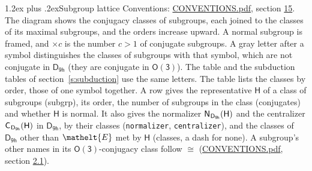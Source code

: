 \documentclass[10pt,a4paper]{article}
\makeatletter
\renewcommand\section{\@startsection{section}{1}{\z@}{-3ex plus -1ex minus -.2ex}%
  {1.2ex plus .2ex}{\normalfont\large\sffamily\bfseries\color{parttitle}}}
\numberwithin{equation}{section}
\newcommand{\eltfont}[1]{{\let\sigma\eltsigma\mathelt{#1}}}
\newcommand{\grp}[1]{\mathsf{#1}}
\newcommand{\cls}[1]{\eltfont{#1}}
\newcommand{\samecls}{\cong}
\newcommand{\hairsp}{\mkern1mu}
\makeatother
\begin{document}
\section{Subgroup lattice}\label{s:subgroups}
Conventions: \href{../../CONVENTIONS.pdf}{CONVENTIONS.pdf}, section \href{../../CONVENTIONS.pdf\#conv.15}{15}.
The diagram shows the conjugacy classes of subgroups, each joined to the classes of its maximal subgroups, and the orders increase upward. A normal subgroup is framed, and ${\times}c$ is the number $c > 1$ of conjugate subgroups. A gray letter after a symbol distinguishes the classes of subgroups with that symbol, which are not conjugate in $\grp{D_{9h}}$ (they are conjugate in \href{O3.pdf}{$\grp{O(3)}$}). The table and the subduction tables of section~\ref{s:subduction} use the same letters. The table lists the classes by order, those of one symbol together. \label{n:group.H}\label{n:head.subgroup}\label{n:head.order}\label{n:head.conjugates}\label{n:head.normal}A row gives the representative $\grp{H}$ of a class of subgroups (subgrp), its order, the number of subgroups in the class (conjugates) and whether $\grp{H}$ is normal. \label{n:group.normalizer}\label{n:group.centralizer}\label{n:head.classes}It also gives the normalizer $\grp{N}_{\hairsp \grp{D_{9h}}}(\grp{H})$ and the centralizer $\grp{C}_{\hairsp \grp{D_{9h}}}(\grp{H})$ in $\grp{D_{9h}}$, by their classes (\texttt{normalizer}, \texttt{centralizer}), and the classes of $\grp{D_{9h}}$ other than $\cls{E}$ met by $\grp{H}$ (classes, a dash for none). A subgroup's other names in its \href{O3.pdf}{$\grp{O(3)}$}-conjugacy class follow $\samecls$ (\href{../../CONVENTIONS.pdf}{CONVENTIONS.pdf}, section \href{../../CONVENTIONS.pdf\#conv.2.1}{2.1}).
\end{document}
